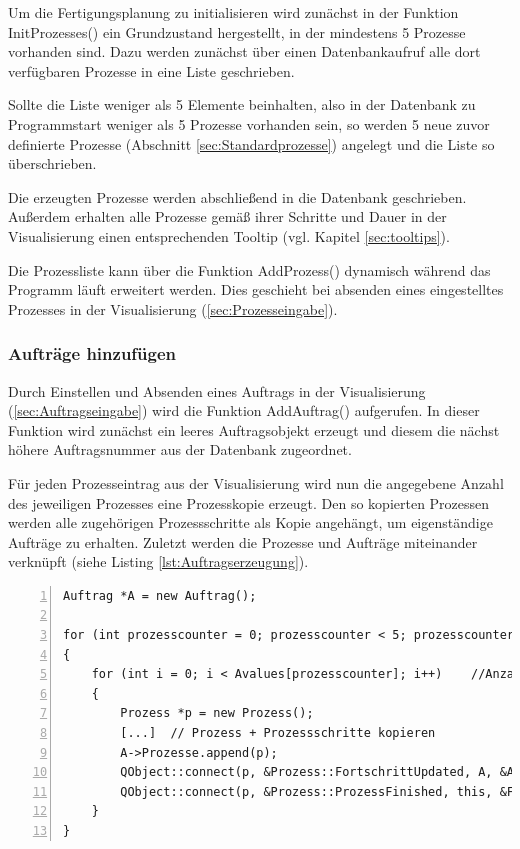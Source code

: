 Um die Fertigungsplanung zu initialisieren wird zunächst in der Funktion InitProzesses() ein Grundzustand hergestellt, in der mindestens 5 Prozesse vorhanden sind. Dazu werden zunächst über einen Datenbankaufruf alle dort verfügbaren Prozesse in eine Liste geschrieben. 

Sollte die Liste weniger als 5 Elemente beinhalten, also in der Datenbank zu Programmstart weniger als 5 Prozesse vorhanden sein, so werden 5 neue zuvor definierte Prozesse (Abschnitt \ref{sec:Standardprozesse}) angelegt und die Liste so überschrieben. 

Die erzeugten Prozesse werden abschließend in die Datenbank geschrieben. Außerdem erhalten alle Prozesse gemäß ihrer Schritte und Dauer in der Visualisierung einen entsprechenden Tooltip (vgl. Kapitel \ref{sec:tooltips}). 

Die Prozessliste kann über die Funktion AddProzess() dynamisch während das Programm läuft erweitert werden. Dies geschieht bei absenden eines eingestelltes Prozesses in der Visualisierung (\ref{sec:Prozesseingabe}). 

\subsubsection{Aufträge hinzufügen}

Durch Einstellen und Absenden eines Auftrags in der Visualisierung (\ref{sec:Auftragseingabe}) wird die Funktion AddAuftrag() aufgerufen. In dieser Funktion wird zunächst ein leeres Auftragsobjekt erzeugt und diesem die nächst höhere Auftragsnummer aus der Datenbank zugeordnet.  

Für jeden Prozesseintrag aus der Visualisierung wird nun die angegebene Anzahl des jeweiligen Prozesses eine Prozesskopie erzeugt. Den so kopierten Prozessen werden alle zugehörigen Prozessschritte als Kopie angehängt, um eigenständige Aufträge zu erhalten. Zuletzt werden die Prozesse und Aufträge miteinander verknüpft (siehe Listing \ref{lst:Auftragserzeugung}).

\begin{lstlisting}[frame=single, breaklines=true, numbers=left, stepnumber=2, firstnumber=1, numberstyle = \tiny, caption=Auftragserzeugung und Verknüpfungen,label=lst:Auftragserzeugung]
Auftrag *A = new Auftrag();

for (int prozesscounter = 0; prozesscounter < 5; prozesscounter++) //5 Prozess UI Elemente
{
    for (int i = 0; i < Avalues[prozesscounter]; i++)    //Anzahl der eingegebenen Prozesszahl
    {
        Prozess *p = new Prozess();
        [...]  // Prozess + Prozessschritte kopieren
        A->Prozesse.append(p);
        QObject::connect(p, &Prozess::FortschrittUpdated, A, &Auftrag::UpdateFortschritt);
        QObject::connect(p, &Prozess::ProzessFinished, this, &Fertigungsplanung::StationReady);
    }
}
\end{lstlisting}


